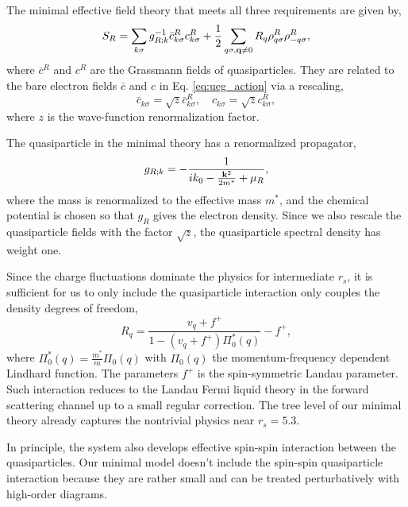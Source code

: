 \documentclass[reprint,amsmath,amssymb,aps,prb]{revtex4-1}
\begin{document}
The minimal effective field theory that meets all three requirements are given by,
\begin{equation}
    \label{eq:renorm_action}
    S_R=\sum_{k \sigma} g_{R;k}^{-1}\bar{c}^R_{k \sigma} c^R_{k \sigma} + \frac{1}{2}\sum_{q\sigma, \mathbf{q} \neq 0}  R_q \rho^R_{q\sigma} \rho^R_{-q\sigma},
\end{equation}
where $\bar{c}^R$ and $c^R$ are the Grassmann fields of quasiparticles. They are related to the bare electron fields $\bar{c}$ and $c$ in Eq. \eqref{eq:ueg_action} via a rescaling,
\begin{equation}
    \label{eq:rescaling}
    \bar{c}_{k\sigma} = \sqrt{z} \bar{c}^R_{k\sigma}, \quad c_{k\sigma} = \sqrt{z} c^R_{k\sigma},
\end{equation}
where $z$ is the wave-function renormalization factor.

The quasiparticle in the minimal theory has a renormalized propagator,
\begin{equation}
    \label{eq:gR}
    g_{R;k}=-\frac{1}{ik_0-\frac{\mathbf{k}^2}{2m^*}+\mu_R},
\end{equation}
where the mass is renormalized to the effective mass $m^*$, and the chemical potential is chosen so that $g_R$ gives the electron density. Since we also rescale the quasiparticle fields with the factor $\sqrt{z}$, the quasiparticle spectral density has weight one.

Since the charge fluctuations dominate the physics for intermediate $r_s$, it is sufficient for us to only include the quasiparticle interaction only couples the density degrees of freedom,
\begin{equation}
    \label{eq:R}
    R_q=\frac{v_q+f^+}{1-(v_q+f^+)\Pi^*_0(q)}-f^+,
\end{equation}
where $\Pi_0^*(q)=\frac{m^*}{m}\Pi_0(q)$ with $\Pi_0(q)$ the momentum-frequency dependent Lindhard function. The parameters $f^+$ is the spin-symmetric Landau parameter. Such interaction reduces to the Landau Fermi liquid theory in the forward scattering channel up to a small regular correction. The tree level of our minimal theory already captures the nontrivial physics near $r_s=5.3$.

In principle, the system also develops effective spin-spin interaction between the quasiparticles. Our minimal model doesn't include the spin-spin quasiparticle interaction because they are rather small and can be treated perturbatively with high-order diagrams.

\end{document}
